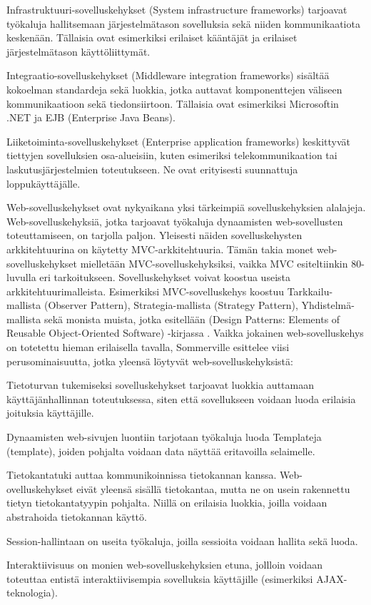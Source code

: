 \documentclass[utf8]{gradu3}
\begin{document}
\begin{desclist}
\item[Infrastruktuuri-sovelluskehykset (System infrastructure frameworks)] tarjoavat työkaluja hallitsemaan järjestelmätason sovelluksia sekä niiden kommunikaatiota keskenään. Tällaisia ovat esimerkiksi erilaiset kääntäjät ja erilaiset järjestelmätason käyttöliittymät. 
\item[Integraatio-sovelluskehykset (Middleware integration frameworks)] sisältää kokoelman standardeja sekä luokkia, jotka auttavat komponenttejen väliseen kommunikaatioon sekä tiedonsiirtoon. Tällaisia ovat esimerkiksi Microsoftin .NET ja EJB (Enterprise Java Beans). 
\item[Liiketoiminta-sovelluskehykset (Enterprise application frameworks)] keskittyvät tiettyjen sovelluksien osa-alueisiin, kuten esimeriksi telekommunikaation tai laskutusjärjestelmien toteutukseen. Ne ovat erityisesti suunnattuja loppukäyttäjälle.

\end{desclist}
Web-sovelluskehykset ovat nykyaikana yksi tärkeimpiä sovelluskehyksien alalajeja. Web-sovelluskehyksiä, jotka tarjoavat työkaluja dynaamisten web-sovellusten toteuttamiseen, on tarjolla paljon. Yleisesti näiden sovelluskehysten arkkitehtuurina on käytetty MVC-arkkitehtuuria. Tämän takia monet web-sovelluskehykset mielletään MVC-sovelluskehyksiksi, vaikka MVC esiteltiinkin 80-luvulla eri tarkoitukseen. Sovelluskehykset voivat koostua useista arkkitehtuurimalleista. Esimerkiksi MVC-sovelluskehys koostuu Tarkkailu-mallista (Observer Pattern), Strategia-mallista (Strategy Pattern), Yhdistelmä-mallista sekä monista muista, jotka esitellään (Design Patterns: Elements of Reusable Object-Oriented Software) -kirjassa \parencite{design_patterns}. Vaikka jokainen web-sovelluskehys on totetettu hieman erilaisella tavalla, Sommerville esittelee viisi perusominaisuutta, jotka yleensä löytyvät web-sovelluskehyksistä:

\begin{desclist}
\item[Tietoturvan] tukemiseksi sovelluskehykset tarjoavat luokkia auttamaan käyttäjänhallinnan toteutuksessa, siten että sovellukseen voidaan luoda erilaisia joituksia käyttäjille. 
\item[Dynaamisten web-sivujen] luontiin tarjotaan työkaluja luoda Templateja (template), joiden pohjalta voidaan data näyttää eritavoilla selaimelle.
\item[Tietokantatuki] auttaa kommunikoinnissa tietokannan kanssa. Web-ovelluskehykset eivät yleensä sisällä tietokantaa, mutta ne on usein rakennettu tietyn tietokantatyypin pohjalta. Niillä on erilaisia luokkia, joilla voidaan abstrahoida tietokannan käyttö.
\item[Session-hallintaan] on useita työkaluja, joilla sessioita voidaan hallita sekä luoda.
\item[Interaktiivisuus] on monien web-sovelluskehyksien etuna, jollloin voidaan toteuttaa entistä interaktiivisempia sovelluksia käyttäjille (esimerkiksi AJAX-teknologia).
\end{desclist}
\end{document}
